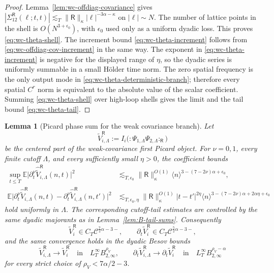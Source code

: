 \documentclass[10pt]{amsart}
\numberwithin{equation}{section}
\theoremstyle{plain}
\newtheorem{lemma}[theorem]{Lemma}
\theoremstyle{definition}
\theoremstyle{remark}
\newcommand{\E}{\mathbb{E}}
\begin{document}
\begin{proof}
Lemma~\ref{lem:wc-offdiag-covariance} gives \(|\Sigma_{12}^{\mathsf R}(\ell;t,t)|\lesssim_T \|\mathsf R\|_\kappa |\ell|^{-3\alpha-\kappa}\) on \(|\ell|\sim N\).  The number of lattice points in the shell is \(O(N^{3+\epsilon_0})\), with \(\epsilon_0\) used only as a uniform dyadic loss.  This proves \eqref{eq:wc-theta-shell}.  The increment bound \eqref{eq:wc-theta-increment} follows from \eqref{eq:wc-offdiag-cov-increment} in the same way.  The exponent in \eqref{eq:wc-theta-increment} is negative for the displayed range of \(\eta\), so the dyadic series is uniformly summable in a small Hölder time norm.  The zero spatial frequency is the only output mode in \eqref{eq:wc-theta-deterministic-branch}; therefore every spatial \(C^r\) norm is equivalent to the absolute value of the scalar coefficient.  Summing \eqref{eq:wc-theta-shell} over high-loop shells gives the limit and the tail bound \eqref{eq:wc-theta-tail}.
\end{proof}


\begin{lemma}[Picard phase sum for the weak covariance branch]\label{lem:wc-first-picard-phase-sum}
Let
\[
        \widetilde V_{i,\Lambda}^{\mathsf R}:=
        I_i\bigl(:\Psi_{1,\Lambda}\Psi_{2,\Lambda}:_{\mathsf R}\bigr)
\]
be the centered part of the weak-covariance first Picard object.  For \(\nu=0,1\), every finite cutoff \(\Lambda\), and every sufficiently small \(\eta>0\), the coefficient bounds
\begin{align}
        \sup_{t\le T}\E\bigl|\partial_t^\nu\widehat{\widetilde V}_{i,\Lambda}^{\mathsf R}(n,t)\bigr|^2
        &\lesssim_{T,\epsilon_0}\|\mathsf R\|_\kappa^{O(1)}
        \langle n\rangle^{3-(7-2\nu)\alpha+\epsilon_0},\label{eq:wc-picard-centered-fixed}\\
        \E\bigl|\partial_t^\nu\widehat{\widetilde V}_{i,\Lambda}^{\mathsf R}(n,t)-
        \partial_t^\nu\widehat{\widetilde V}_{i,\Lambda}^{\mathsf R}(n,t')\bigr|^2
        &\lesssim_{T,\epsilon_0,\eta}\|\mathsf R\|_\kappa^{O(1)}
        |t-t'|^{2\eta}
        \langle n\rangle^{3-(7-2\nu)\alpha+2\alpha\eta+\epsilon_0}
        \label{eq:wc-picard-centered-increment}
\end{align}
hold uniformly in \(\Lambda\).  The corresponding cutoff-tail estimates are controlled by the same dyadic majorants as in Lemma~\ref{lem:B-tail-sums}.  Consequently
\[
        \widetilde V_i^{\mathsf R}\in C_T\mathcal C^{\frac72\alpha-3-},
        \qquad
        \partial_t\widetilde V_i^{\mathsf R}\in C_T\mathcal C^{\frac52\alpha-3-},
\]
and the same convergence holds in the dyadic Besov bounds
\[
        \widetilde V_{i,\Lambda}^{\mathsf R}\to \widetilde V_i^{\mathsf R}
        \quad\text{in}\quad
        L_T^\infty B_{2,\infty}^{\rho_V},
        \qquad
        \partial_t\widetilde V_{i,\Lambda}^{\mathsf R}\to \partial_t\widetilde V_i^{\mathsf R}
        \quad\text{in}\quad
        L_T^\infty B_{2,\infty}^{\rho_V-\alpha}
\]
for every strict choice of \(\rho_V<7\alpha/2-3\).
\end{lemma}
\end{document}
